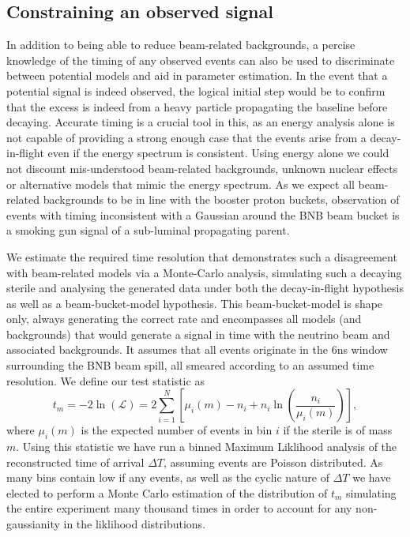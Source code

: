 \documentclass[11pt, a4paper]{article}
\begin{document}
\subsection{\label{sec:timing_physics}Constraining an observed signal}

In addition to being able to reduce beam-related backgrounds, a percise knowledge of the timing of any observed
events can also be used to discriminate between potential models and aid in parameter estimation. In the event that a potential
signal is indeed observed, the logical initial step would be to confirm that the excess is
indeed from a heavy particle propagating the baseline before decaying. Accurate timing
is a crucial tool in this, as an energy analysis alone is not capable of providing a
strong enough case that the events arise from a decay-in-flight even if the
energy spectrum is consistent. Using energy alone we could not discount mis-understood
beam-related backgrounds, unknown nuclear effects or alternative models that
mimic the energy spectrum. As we expect all beam-related backgrounds to be in
line with the booster proton buckets, observation of events with timing
inconsistent with a Gaussian around the BNB beam bucket is a smoking gun signal
of a sub-luminal propagating parent. 

We estimate the required time resolution that demonstrates such a disagreement
with beam-related models via a Monte-Carlo analysis, simulating
such a decaying sterile and analysing the generated data under both the
decay-in-flight hypothesis as well as a beam-bucket-model hypothesis.  This
beam-bucket-model is shape only, always generating the correct rate and
encompasses all models (and backgrounds) that would generate a signal in time
with the neutrino beam and associated backgrounds. It assumes that all events
originate in the 6ns window surrounding the BNB beam spill, all smeared
according to an assumed time resolution. We define our test statistic  as
\cite{Agashe:2014kda} \[ t_m = -2 \ln \left(\mathcal{L}\right) =  2
\sum_{i=1}^N \left[ \mu_i(m)-n_i +n_i \ln(\frac{n_i}{\mu_i(m)})  \right], \]
where $\mu_i(m)$ is the expected number of events in bin $i$ if the sterile is
of mass $m$. Using this statistic we have run a binned
Maximum Liklihood analysis of the reconstructed time of arrival $\Delta T$,
assuming events are Poisson distributed.  As many bins contain low
if any events, as well as the cyclic nature of $\Delta T$ we have elected to
perform a Monte Carlo estimation of the distribution of $t_m$ simulating the
entire experiment many thousand times in order to account for any
non-gaussianity in the liklihood distributions. 
\end{document}
